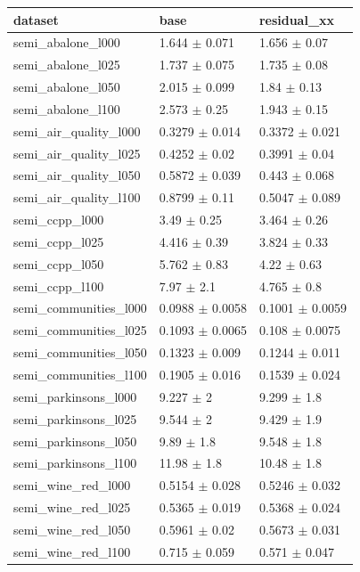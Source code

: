 \begin{tabular}{lll}
\toprule
dataset & base & residual\_xx \\
\midrule
semi\_abalone\_l000 & 1.644 $\pm$ 0.071 & 1.656 $\pm$ 0.07 \\
semi\_abalone\_l025 & 1.737 $\pm$ 0.075 & 1.735 $\pm$ 0.08 \\
semi\_abalone\_l050 & 2.015 $\pm$ 0.099 & 1.84 $\pm$ 0.13 \\
semi\_abalone\_l100 & 2.573 $\pm$ 0.25 & 1.943 $\pm$ 0.15 \\
semi\_air\_quality\_l000 & 0.3279 $\pm$ 0.014 & 0.3372 $\pm$ 0.021 \\
semi\_air\_quality\_l025 & 0.4252 $\pm$ 0.02 & 0.3991 $\pm$ 0.04 \\
semi\_air\_quality\_l050 & 0.5872 $\pm$ 0.039 & 0.443 $\pm$ 0.068 \\
semi\_air\_quality\_l100 & 0.8799 $\pm$ 0.11 & 0.5047 $\pm$ 0.089 \\
semi\_ccpp\_l000 & 3.49 $\pm$ 0.25 & 3.464 $\pm$ 0.26 \\
semi\_ccpp\_l025 & 4.416 $\pm$ 0.39 & 3.824 $\pm$ 0.33 \\
semi\_ccpp\_l050 & 5.762 $\pm$ 0.83 & 4.22 $\pm$ 0.63 \\
semi\_ccpp\_l100 & 7.97 $\pm$ 2.1 & 4.765 $\pm$ 0.8 \\
semi\_communities\_l000 & 0.0988 $\pm$ 0.0058 & 0.1001 $\pm$ 0.0059 \\
semi\_communities\_l025 & 0.1093 $\pm$ 0.0065 & 0.108 $\pm$ 0.0075 \\
semi\_communities\_l050 & 0.1323 $\pm$ 0.009 & 0.1244 $\pm$ 0.011 \\
semi\_communities\_l100 & 0.1905 $\pm$ 0.016 & 0.1539 $\pm$ 0.024 \\
semi\_parkinsons\_l000 & 9.227 $\pm$ 2 & 9.299 $\pm$ 1.8 \\
semi\_parkinsons\_l025 & 9.544 $\pm$ 2 & 9.429 $\pm$ 1.9 \\
semi\_parkinsons\_l050 & 9.89 $\pm$ 1.8 & 9.548 $\pm$ 1.8 \\
semi\_parkinsons\_l100 & 11.98 $\pm$ 1.8 & 10.48 $\pm$ 1.8 \\
semi\_wine\_red\_l000 & 0.5154 $\pm$ 0.028 & 0.5246 $\pm$ 0.032 \\
semi\_wine\_red\_l025 & 0.5365 $\pm$ 0.019 & 0.5368 $\pm$ 0.024 \\
semi\_wine\_red\_l050 & 0.5961 $\pm$ 0.02 & 0.5673 $\pm$ 0.031 \\
semi\_wine\_red\_l100 & 0.715 $\pm$ 0.059 & 0.571 $\pm$ 0.047 \\
\bottomrule
\end{tabular}
